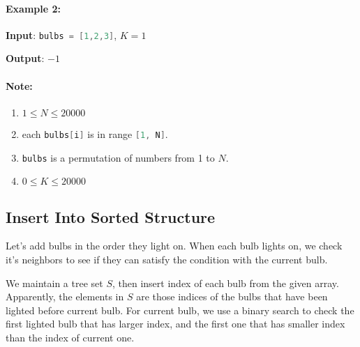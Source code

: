 \paragraph{Example 2:}
\begin{flushleft}


\textbf{Input}: \lstinline[language=C++, basicstyle=\small\ttfamily, keywordstyle=\bfseries\color{green!40!black}]|bulbs = [1,2,3]|, $K = 1$

\textbf{Output}: $-1$
\end{flushleft}

\paragraph{Note:}

\begin{enumerate}
\item $1 \leq N \leq 20000$
\item each \lstinline[language=C++, basicstyle=\small\ttfamily, keywordstyle=\bfseries\color{green!40!black}]|bulbs[i]| is in range \lstinline[language=C++, basicstyle=\small\ttfamily, keywordstyle=\bfseries\color{green!40!black}]|[1, N]|.
\item \lstinline[language=C++, basicstyle=\small\ttfamily, keywordstyle=\bfseries\color{green!40!black}]|bulbs| is a permutation of numbers from 1 to $N$.
\item $0 \leq K \leq 20000$
\end{enumerate}

\subsection{Insert Into Sorted Structure }
Let's add bulbs in the order they light on. When each bulb lights on, we check it's neighbors to see if they can satisfy the condition with the current bulb.

We maintain a tree set $S$, then insert index of each bulb from the given array. Apparently, the elements in $S$ are those indices of the bulbs that have been lighted before current bulb. For current bulb, we use a binary search to check the first lighted bulb that has larger index, and the first one that has smaller index than the index of current one.


